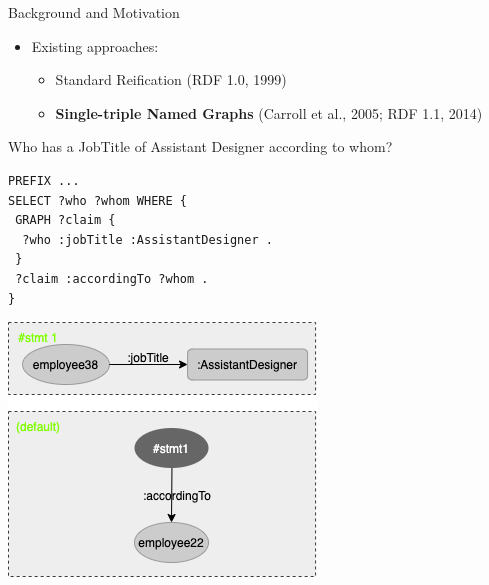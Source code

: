 \documentclass[aspectratio=169]{beamer}
\begin{document}
\begin{frame}[fragile]{Background and Motivation}
    \begin{itemize}
        \item Existing approaches:
            \begin{itemize}
                \item Standard Reification (RDF 1.0, 1999)
                \item \textbf{Single-triple Named Graphs} (Carroll et al., 2005; RDF 1.1, 2014)
            \end{itemize}
    \end{itemize}
        \begin{minipage}{0.56\textwidth}
    \small{Who has a JobTitle of Assistant Designer according to whom?}
\begin{lstlisting}[language=SPARQL]
PREFIX ...
SELECT ?who ?whom WHERE {
 GRAPH ?claim {
  ?who :jobTitle :AssistantDesigner .
 }
 ?claim :accordingTo ?whom .
}
\end{lstlisting}
\end{minipage}
\begin{minipage}{0.43\textwidth}
\centering
	\includegraphics[scale=0.5]{lecture/images/Example-2-NamedGraph.png}
\end{minipage}
\end{frame}
\end{document}
